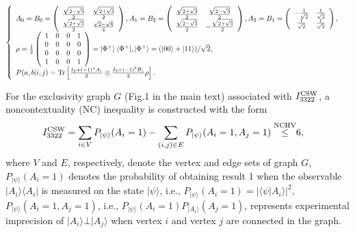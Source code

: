 \documentclass[pra,aps,notitlepage,superscriptaddress,showpacs,showkeys]{revtex4-1}
\theoremstyle{definition}
\theoremstyle{remark}
\begin{document}
\begin{eqnarray}
\left\{
  \begin{array}{ll}
    A_0=B_0=\left(
          \begin{array}{cc}
            \frac{\sqrt{2-\sqrt{3}}}{2} & \frac{\sqrt{2+\sqrt{3}}}{2} \\
            \frac{\sqrt{2+\sqrt{3}}}{2} & \frac{\sqrt{2}-\sqrt{6}}{4} \\
          \end{array}
        \right),
    A_1=B_2=\left(
          \begin{array}{cc}
            \frac{\sqrt{2+\sqrt{3}}}{2} & \frac{\sqrt{2-\sqrt{3}}}{2} \\
            \frac{\sqrt{2-\sqrt{3}}}{2} & -\frac{\sqrt{2+\sqrt{3}}}{2} \\
          \end{array}
        \right),
    A_2=B_1=\left(
          \begin{array}{cc}
            -\frac{1}{\sqrt{2}} & \frac{1}{\sqrt{2}} \\
            \frac{1}{\sqrt{2}} & \frac{1}{\sqrt{2}} \\
          \end{array}
        \right), & \\
\rho=\frac{1}{2}\left(
       \begin{array}{cccc}
        1 & 0 & 0 & 1 \\
         0 & 0 & 0 & 0 \\
         0 & 0 & 0 & 0 \\
         1 & 0 & 0 & 1 \\
       \end{array}
     \right)=\ket{\Phi^+}\langle\Phi^+|
,\ket{\Phi^+}=(|00\rangle+|11\rangle)/\sqrt{2}, &\\
P(a,b|i,j)={\rm{Tr}}\left[\frac{I_2+(-1)^aA_i}{2}\otimes \frac{I_2+(-1)^bB_j}{2}\rho\right]. &
  \end{array}
\right.
\label{eq:BS-settings}
\end{eqnarray}



For the exclusivity graph $G$ (Fig.1 in the main text) associated with $I_{3322}^{\rm CSW}$,
a noncontextuality (NC) inequality is constructed with the form
\begin{eqnarray}
I_{3322}^{\rm CSW}
=\sum_{i\in V}P_{|\psi\rangle}(A_i=1)-\sum_{(i,j)\in E}P_{|\psi\rangle}(A_i=1,A_j=1)\overset{{\rm{NCHV}}}\leq& 6,
\label{I3322QC}
\end{eqnarray}
where $V$ and $E$, respectively, denote the vertex and edge sets of graph $G$,
$P_{|\psi\rangle}(A_i=1)$ denotes the probability of obtaining result 1 when the observable $|A_i\rangle\langle A_i|$ is measured on the state $|\psi\rangle $,  i.e., $P_{|\psi\rangle}(A_i=1)= |\langle \psi|A_i\rangle|^2,$ $P_{|\psi\rangle}(A_i=1,A_j=1)$, i.e.,  $P_{|\psi\rangle}(A_i=1)P_{|A_i\rangle}(A_j=1)$, represents experimental imprecision of $|A_i\rangle\bot |A_j\rangle$ when vertex $i$ and vertex $j$ are connected in the graph.
\end{document}
